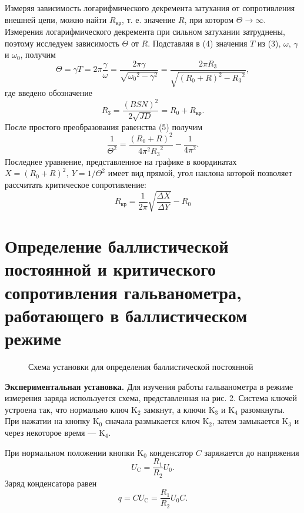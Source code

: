 Измеряя зависимость логарифмического декремента затухания от сопротивления внешней цепи, можно найти $R_{\text{кр}}$, т. е. значение $R$, при котором 
$\Theta \rightarrow \infty$. Измерения логарифмического декремента при сильном затухании затруднены, поэтому исследуем зависимость $\Theta$ от $R$. Подставляя в (4) значения $T$ из (3), $\omega$, $\gamma$ и $\omega_0$, получим
\begin{equation}
    \Theta = \gamma T = 2 \pi \frac{\gamma}{\omega} = \frac{2 \pi \gamma}{\sqrt{{\omega_0}^2 - \gamma^2}} = \frac{2 \pi R_3}{\sqrt{(R_0 + R)^2 - {R_3}^2}},
\end{equation}
где введено обозначение
\begin{equation}
    R_3 = \frac{(BSN)^2}{2\sqrt{JD}} = R_0 + R_{\text{кр}}.
\end{equation}
После простого преобразования равенства (5) получим
\begin{equation}
    \frac{1}{\Theta^2} = \frac{(R_0 + R)^2}{4 \pi^2 {R_3}^2} - \frac{1}{4 \pi^2}.
\end{equation}
Последнее уравнение, представленное на графике в координатах $X = (R_0 + R)^2,~Y = 1/{\Theta^2}$ имеет вид прямой, угол наклона которой позволяет рассчитать критическое сопротивление:
\begin{equation}
    R_{\text{кр}} = \frac{1}{2 \pi}\sqrt{\frac{\Delta X}{\Delta Y}} - R_0
\end{equation}

\section{\label{sec:level1}Определение баллистической постоянной
и критического сопротивления гальванометра, работающего в баллистическом режиме}

\begin{figure}[h]
\caption{Схема установки для определения баллистической постоянной}
\end{figure}

\textbf{Экспериментальная установка.} Для изучения работы гальванометра в режиме измерения заряда используется схема, представленная на рис. 2. Система ключей устроена так, что нормально ключ $\text{K}_2$ замкнут, а ключи $\text{K}_3$ и $\text{K}_4$ разомкнуты. При нажатии на кнопку $\text{K}_0$ сначала размыкается ключ $\text{K}_2$, затем замыкается $\text{K}_3$ и через некоторое время — $\text{K}_4$.

При нормальном положении кнопки $\text{K}_0$ конденсатор $C$ заряжается до напряжения
$$ U_{\text{C}} = \frac{R_1}{R_2} U_0.$$
Заряд конденсатора равен
\begin{equation}
    q = CU_{\text{C}} = \frac{R_1}{R_2} U_0 C.
\end{equation}

